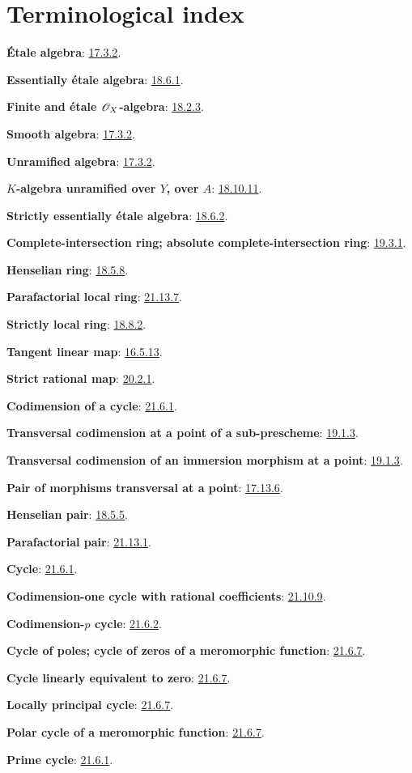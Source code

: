 \clearpage
{}
{}
\section*{Terminological index}

\begingroup
\small
\setlength{\parindent}{0pt}
\setlength{\parskip}{2pt}
\newcommand{\EGAIVterm}[2]{\textbf{#1}: #2.\par}
\newcommand{\EGAIVidxref}[1]{\hyperref[IV.#1]{#1}}

\EGAIVterm{\'Etale algebra}{{\hyperref[section:IV.17]{17.3.2}}}
\EGAIVterm{Essentially \'etale algebra}{{\hyperref[IV.18.6.1]{18.6.1}}}
\EGAIVterm{Finite and \'etale $\mathscr{O}_X$-algebra}{{\hyperref[IV.18.2.3]{18.2.3}}}
\EGAIVterm{Smooth algebra}{{\hyperref[section:IV.17]{17.3.2}}}
\EGAIVterm{Unramified algebra}{{\hyperref[section:IV.17]{17.3.2}}}
\EGAIVterm{$K$-algebra unramified over $Y$, over $A$}{{\hyperref[IV.18.10.11]{18.10.11}}}
\EGAIVterm{Strictly essentially \'etale algebra}{{\hyperref[IV.18.6.2]{18.6.2}}}
\EGAIVterm{Complete-intersection ring; absolute complete-intersection ring}{{\hyperref[IV.19.3.1]{19.3.1}}}
\EGAIVterm{Henselian ring}{{\hyperref[IV.18.5.8]{18.5.8}}}
\EGAIVterm{Parafactorial local ring}{{\hyperref[IV.21.13.7]{21.13.7}}}
\EGAIVterm{Strictly local ring}{{\hyperref[IV.18.8.2]{18.8.2}}}
\EGAIVterm{Tangent linear map}{{\hyperref[section:IV.16]{16.5.13}}}
\EGAIVterm{Strict rational map}{{\hyperref[IV.20]{20.2.1}}}
\EGAIVterm{Codimension of a cycle}{{\hyperref[IV.21.6.1]{21.6.1}}}
\EGAIVterm{Transversal codimension at a point of a sub-prescheme}{{\hyperref[IV.19.1.3]{19.1.3}}}
\EGAIVterm{Transversal codimension of an immersion morphism at a point}{{\hyperref[IV.19.1.3]{19.1.3}}}
\EGAIVterm{Pair of morphisms transversal at a point}{{\hyperref[IV.17.13]{17.13.6}}}
\EGAIVterm{Henselian pair}{{\hyperref[IV.18.5.5]{18.5.5}}}
\EGAIVterm{Parafactorial pair}{{\hyperref[IV.21.13.1]{21.13.1}}}
\EGAIVterm{Cycle}{{\hyperref[IV.21.6.1]{21.6.1}}}
\EGAIVterm{Codimension-one cycle with rational coefficients}{{\hyperref[IV.21.10.9]{21.10.9}}}
\EGAIVterm{Codimension-$p$ cycle}{{\hyperref[IV.21.6.2]{21.6.2}}}
\EGAIVterm{Cycle of poles; cycle of zeros of a meromorphic function}{{\hyperref[IV.21.6.7]{21.6.7}}}
\EGAIVterm{Cycle linearly equivalent to zero}{{\hyperref[IV.21.6.7]{21.6.7}}}
\EGAIVterm{Locally principal cycle}{{\hyperref[IV.21.6.7]{21.6.7}}}
\EGAIVterm{Polar cycle of a meromorphic function}{{\hyperref[IV.21.6.7]{21.6.7}}}
\EGAIVterm{Prime cycle}{{\hyperref[IV.21.6.1]{21.6.1}}}
